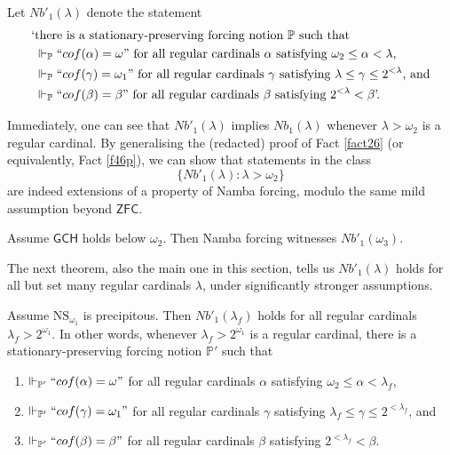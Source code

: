 \documentclass[12pt]{article}
\numberwithin{equation}{section}
\begin{document}
\begin{defi}
Let $Nb'_1(\lambda)$ denote the statement
\begin{align*}
    \text{`} & \text{there is a stationary-preserving forcing notion } \mathbb{P} \text{ such that} \\ 
    & \Vdash_{\mathbb{P}} ``cof(\alpha) = \omega" \text{ for all regular cardinals } \alpha \text{ satisfying } \omega_2 \leq \alpha < \lambda \text{,} \\
    & \Vdash_{\mathbb{P}} ``cof(\gamma) = \omega_1" \text{ for all regular cardinals } \gamma \text{ satisfying } \lambda \leq \gamma \leq 2^{< \lambda} \text{, and} \\
    & \Vdash_{\mathbb{P}} ``cof(\beta) = \beta" \text{ for all regular cardinals } \beta \text{ satisfying } 2^{< \lambda} < \beta \text{'.}
\end{align*}
\end{defi}

Immediately, one can see that $Nb'_1(\lambda)$ implies $Nb_1(\lambda)$ whenever $\lambda > \omega_2$ is a regular cardinal. By generalising the (redacted) proof of Fact \ref{fact26} (or equivalently, Fact \ref{f46p}), we can show that statements in the class
\begin{equation*}
    \{Nb'_1(\lambda) : \lambda > \omega_2\}
\end{equation*}
are indeed extensions of a property of Namba forcing, modulo the same mild assumption beyond $\mathsf{ZFC}$.

\begin{fact}
Assume $\mathsf{GCH}$ holds below $\omega_2$. Then Namba forcing witnesses $Nb'_1(\omega_3)$.
\end{fact}

The next theorem, also the main one in this section, tells us $Nb'_1(\lambda)$ holds for all but set many regular cardinals $\lambda$, under significantly stronger assumptions.

\begin{thm}\label{notion1}
Assume $\mathrm{NS}_{\omega_1}$ is precipitous. Then $Nb'_1(\lambda_f)$ holds for all regular cardinals $\lambda_f > 2^{\omega_1}$. In other words, whenever $\lambda_f > 2^{\omega_1}$ is a regular cardinal, there is a stationary-preserving forcing notion $\mathbb{P}'$ such that 
\begin{enumerate}[label=(\arabic*)]
    \item\label{cond1} $\Vdash_{\mathbb{P}'} ``cof(\alpha) = \omega"$ for all regular cardinals $\alpha$ satisfying $\omega_2 \leq \alpha < \lambda_f$,
    \item\label{cond2} $\Vdash_{\mathbb{P}'} ``cof(\gamma) = \omega_1"$ for all regular cardinals $\gamma$ satisfying $\lambda_f \leq \gamma \leq 2^{< \lambda_f}$, and
    \item\label{cond3} $\Vdash_{\mathbb{P}'} ``cof(\beta) = \beta"$ for all regular cardinals $\beta$ satisfying $2^{< \lambda_f} < \beta$.
\end{enumerate}
\end{thm}
\end{document}
